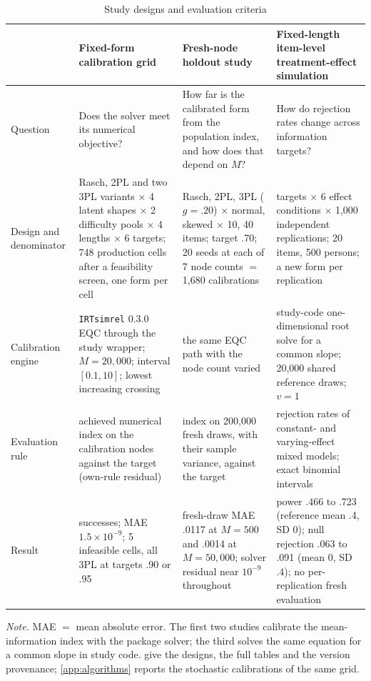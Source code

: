 \begin{table}[ht]
\centering
\caption{Study designs and evaluation criteria}
\label{tab:evidence}
\footnotesize
\setlength{\tabcolsep}{4pt}
\begin{tabular}{@{}>{\raggedright\arraybackslash}p{2.4cm}>{\raggedright\arraybackslash}p{3.6cm}>{\raggedright\arraybackslash}p{3.6cm}>{\raggedright\arraybackslash}p{3.6cm}@{}}
\toprule
 & Fixed-form calibration grid & Fresh-node holdout study & Fixed-length item-level treatment-effect simulation \\
\midrule
Question & Does the solver meet its numerical objective? & How far is the calibrated form from the population index, and how does that depend on $M$? & How do rejection rates change across information targets? \\
\addlinespace
Design and denominator & Rasch, 2PL and two 3PL variants $\times$ 4 latent shapes $\times$ 2 difficulty pools $\times$ 4 lengths $\times$ 6 targets; 748 production cells after a feasibility screen, one form per cell & Rasch, 2PL, 3PL ($g=.20$) $\times$ normal, skewed $\times$ 10, 40 items; target .70; 20 seeds at each of 7 node counts $=$ 1,680 calibrations & 6 targets $\times$ 6 effect conditions $\times$ 1,000 independent replications; 20 items, 500 persons; a new form per replication \\
\addlinespace
Calibration engine & \texttt{IRTsimrel} 0.3.0 EQC through the study wrapper; $M=20{,}000$; interval $[0.1,10]$; lowest increasing crossing & the same EQC path with the node count varied & study-code one-dimensional root solve for a common slope; 20,000 shared reference draws; $v=1$ \\
\addlinespace
Evaluation rule & achieved numerical index on the calibration nodes against the target (own-rule residual) & index on 200,000 fresh draws, with their sample variance, against the target & rejection rates of constant- and varying-effect mixed models; exact binomial intervals \\
\addlinespace
Result & 743 successes; MAE $1.5\times10^{-9}$; 5 infeasible cells, all 3PL at targets .90 or .95 & fresh-draw MAE .0117 at $M=500$ and .0014 at $M=50{,}000$; solver residual near $10^{-9}$ throughout & power .466 to .723 (reference mean .4, SD 0); null rejection .063 to .091 (mean 0, SD .4); no per-replication fresh evaluation \\
\bottomrule
\end{tabular}

\smallskip
\begin{minipage}{0.95\textwidth}
\footnotesize
\emph{Note.} MAE $=$ mean absolute error. The first two studies calibrate the mean-information index with the package solver; the third solves the same equation for a common slope in study code.  give the designs, the full tables and the version provenance; \cref{app:algorithms} reports the stochastic calibrations of the same grid.
\end{minipage}
\end{table}

